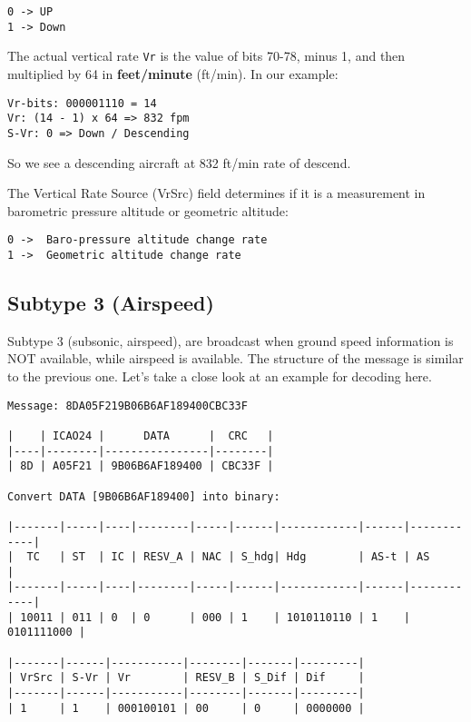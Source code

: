 \begin{verbatim}
0 -> UP
1 -> Down
\end{verbatim}

The actual vertical rate \texttt{Vr} is the value of bits 70-78, minus
1, and then multiplied by 64 in \textbf{feet/minute} (ft/min). In our
example:

\begin{verbatim}
Vr-bits: 000001110 = 14
Vr: (14 - 1) x 64 => 832 fpm
S-Vr: 0 => Down / Descending
\end{verbatim}

So we see a descending aircraft at 832 ft/min rate of descend.

The Vertical Rate Source (VrSrc) field determines if it is a measurement
in barometric pressure altitude or geometric altitude:

\begin{verbatim}
0 ->  Baro-pressure altitude change rate
1 ->  Geometric altitude change rate
\end{verbatim}

\subsection{Subtype 3 (Airspeed)}\label{subtype-3-airspeed}

Subtype 3 (subsonic, airspeed), are broadcast when ground speed
information is NOT available, while airspeed is available. The structure
of the message is similar to the previous one. Let's take a close look
at an example for decoding here.

\begin{verbatim}
Message: 8DA05F219B06B6AF189400CBC33F

|    | ICAO24 |      DATA      |  CRC   |
|----|--------|----------------|--------|
| 8D | A05F21 | 9B06B6AF189400 | CBC33F |

Convert DATA [9B06B6AF189400] into binary:

|-------|-----|----|--------|-----|------|------------|------|------------|
|  TC   | ST  | IC | RESV_A | NAC | S_hdg| Hdg        | AS-t | AS         |
|-------|-----|----|--------|-----|------|------------|------|------------|
| 10011 | 011 | 0  | 0      | 000 | 1    | 1010110110 | 1    | 0101111000 |

|-------|------|-----------|--------|-------|---------|
| VrSrc | S-Vr | Vr        | RESV_B | S_Dif | Dif     |
|-------|------|-----------|--------|-------|---------|
| 1     | 1    | 000100101 | 00     | 0     | 0000000 |
\end{verbatim}

